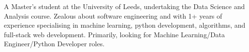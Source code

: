 

\begin{cvparagraph}

A Master’s student at the University of Leeds, undertaking the Data Science and Analysis course. Zealous about software engineering and with 1+ years of experience specialising in machine learning, python development, algorithms, and full-stack web development. Primarily, looking for Machine Learning/Data Engineer/Python Developer roles.
\end{cvparagraph}

